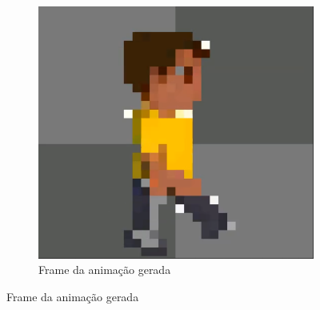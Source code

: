 \begin{figure}[htbp]
\begin{subfigure}{0.35\linewidth}
        \includegraphics[width=1\linewidth]{figs/pixelLab/dia3/print6.PNG}
        \caption{\small Frame da animação gerada}
        \label{fig:pixelLabAnimacao5b}
    \end{subfigure}
\end{figure}


